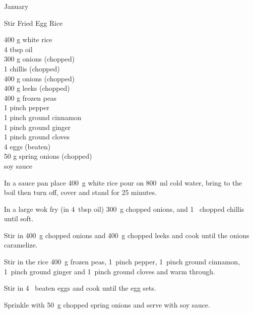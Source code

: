 \begin{menu}{January}
    \begin{recipe}{2}{Stir Fried Egg Rice}%
		\begin{ingredients}
		400 g white rice  \\
	4 tbsp oil  \\
	300 g onions (chopped) \\
	1  chillis (chopped) \\
	400 g onions (chopped) \\
	400 g leeks (chopped) \\
	400 g frozen peas  \\
	1 pinch pepper  \\
	1 pinch ground cinnamon  \\
	1 pinch ground ginger  \\
	1 pinch ground cloves  \\
	4  eggs (beaten) \\
	50 g spring onions (chopped) \\
	  soy sauce  \\
	
		\end{ingredients}
	
    \begin{instructions}
    \item 
      In a
      sauce pan
      place
      400~g  white rice
      pour on
      800~ml  cold water,
      bring to the boil then turn off, cover and stand for 25 minutes.
    \item 
        In a large wok fry 
        (in 4~tbsp  oil)
        300~g chopped onions,
        and
        1~ chopped chillis
        until soft.      
      \item 
        Stir in
        400~g chopped onions
        and
        400~g chopped leeks
        and cook until the onions caramelize.      
      \item 
        Stir in the rice
        400~g  frozen peas,
        1~pinch  pepper,
        1~pinch  ground cinnamon,
        1~pinch  ground ginger
        and
        1~pinch  ground cloves
        and warm through.
      \item 
        Stir in
        4~ beaten eggs
        and cook until the egg sets.
      \item 
        Sprinkle with
        50~g chopped spring onions
        and serve with
          soy sauce.
      
    \end{instructions}
    \end{recipe}%
  

\end{menu}
